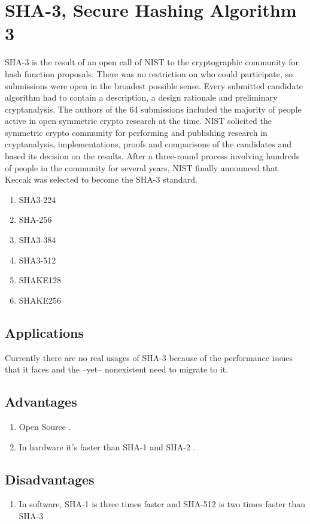 \documentclass[]{article}
\begin{document}
\section{SHA-3, Secure Hashing Algorithm 3}
SHA-3 is the result of an open call of NIST to the cryptographic community for hash function proposals. There was no restriction on who could participate, so submissions were open in the broadest possible sense. Every submitted candidate algorithm had to contain a description, a design rationale and preliminary cryptanalysis. The authors of the 64 submissions included the majority of people active in open symmetric crypto research at the time. NIST solicited the symmetric crypto community for performing and publishing research in cryptanalysis, implementations, proofs and comparisons of the candidates and based its decision on the results. After a three-round process involving hundreds of people in the community for several years, NIST finally announced that Keccak was selected to become the SHA-3 standard\cite{biKeccakTeambid}.
\begin{enumerate}
	\item SHA3-224
	\item SHA-256
	\item SHA3-384
	\item SHA3-512
	\item SHAKE128
	\item SHAKE256
\end{enumerate}

\subsection{Applications}
Currently there are no real usages of SHA-3 because of the performance issues that it faces and the --yet-- nonexistent need to migrate to it.

\subsection{Advantages}
\begin{enumerate}
	\item Open Source \cite{KeccakTeam}.
	\item In hardware it's faster than SHA-1 and SHA-2 \cite{grimesWhyArenWe2018}.
\end{enumerate}

\subsection{Disadvantages}
\begin{enumerate}
	\item In software, SHA-1 is three times faster and SHA-512 is two times faster than SHA-3 \cite{grimesWhyArenWe2018}
\end{enumerate}

		
\newpage
\printbibliography
 
\end{document}
